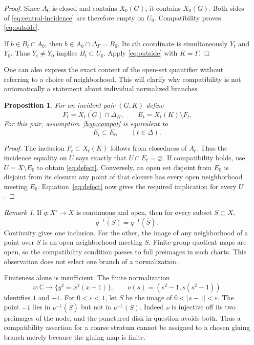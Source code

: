 \documentclass[11pt]{article}
\newcommand{\C}{\mathbb C}
\newcommand{\cl}[1]{\overline{#1}}
\newtheorem{proposition}[theorem]{Proposition}
\theoremstyle{definition}
\theoremstyle{remark}
\newtheorem{remark}[theorem]{Remark}
\begin{document}
\begin{proof}
Since $A_0$ is closed and contains $X_0(G)$, it contains $\cl{X_0(G)}$. Both sides of \eqref{eq:central-incidence} are therefore empty on $U_0$. Compatibility proves \eqref{eq:outside}.

If $b\in B_t\cap A_0$, then $b\in A_0\cap\Delta_\Gamma=B_0$. Its $i$th coordinate is simultaneously $Y_t$ and $Y_0$. Thus $Y_t\ne Y_0$ implies $B_t\subset U_0$. Apply \eqref{eq:outside} with $K=\Gamma$.
\end{proof}

One can also express the exact content of the open-set quantifier without referring to a choice of neighborhood. This will clarify why compatibility is not automatically a statement about individual normalized branches.

\begin{proposition}\label{prop:defect}
For an incident pair $(G,K)$ define
\[
 F_t=\cl{X_t(G)}\cap\Delta_K,\qquad
 E_t=X_t(K)\setminus F_t.
\]
For this pair, assumption~\ref{hyp:compat} is equivalent to
\begin{equation}\label{eq:defect}
 E_t\subset\cl{E_0}\qquad(t\in\Delta).
\end{equation}
\end{proposition}

\begin{proof}
The inclusion $F_t\subset X_t(K)$ follows from closedness of $A_t$. Thus the incidence equality on $U$ says exactly that $U\cap E_t=\varnothing$. If compatibility holds, use $U=X\setminus\cl{E_0}$ to obtain \eqref{eq:defect}. Conversely, an open set disjoint from $E_0$ is disjoint from its closure: any point of that closure has every open neighborhood meeting $E_0$. Equation~\eqref{eq:defect} now gives the required implication for every $U$.
\end{proof}

\begin{remark}\label{rem:branches}
If $q:X'\to X$ is continuous and open, then for every subset $S\subset X$,
\[
 \cl{q^{-1}(S)}=q^{-1}(\cl S).
\]
Continuity gives one inclusion. For the other, the image of any neighborhood of a point over $\cl S$ is an open neighborhood meeting $S$. Finite-group quotient maps are open, so the compatibility condition passes to full preimages in such charts. This observation does not select one branch of a normalization.

Finiteness alone is insufficient. The finite normalization
\[
 \nu:\C\longrightarrow\{y^2=x^2(x+1)\},\qquad
 \nu(s)=(s^2-1,s(s^2-1))
\]
identifies $1$ and $-1$. For $0<\varepsilon<1$, let $S$ be the image of $0<|s-1|<\varepsilon$. The point $-1$ lies in $\nu^{-1}(\cl S)$ but not in $\cl{\nu^{-1}(S)}$. Indeed $\nu$ is injective off its two preimages of the node, and the punctured disk in question avoids both. Thus a compatibility assertion for a coarse stratum cannot be assigned to a chosen gluing branch merely because the gluing map is finite.
\end{remark}
\end{document}
